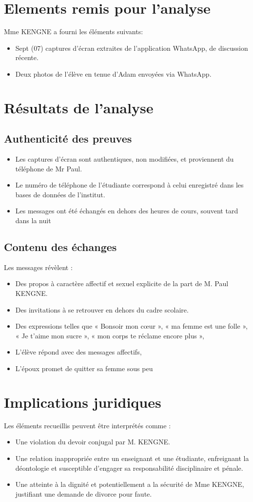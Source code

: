 \documentclass[12pt, a4paper]{article}
\begin{document}
\section{Elements remis pour l'analyse}
Mme KENGNE a fourni les éléments suivants:
\begin{itemize}
	\item Sept (07) captures d’écran extraites de l’application WhatsApp, de discussion
	      récente.
	\item Deux photos de l’élève en tenue d’Adam envoyées via WhatsApp.
\end{itemize}
\section{Résultats de l’analyse}
\subsection{Authenticité des preuves}
\begin{itemize}
	\item Les captures d’écran sont authentiques, non modifiées, et proviennent du
	      téléphone de Mr Paul.
	\item Le numéro de téléphone de l’étudiante correspond à celui enregistré dans les
	      bases de données de l’institut.
	\item Les messages ont été échangés en dehors des heures de cours, souvent tard dans
	      la nuit
\end{itemize}
\subsection{Contenu des échanges}
Les messages révèlent :
\begin{itemize}
	\item Des propos à caractère affectif et sexuel explicite de la part de M. Paul
	      KENGNE.
	\item Des invitations à se retrouver en dehors du cadre scolaire.
	\item Des expressions telles que « Bonsoir mon cœur », « ma femme est une folle », «
	      Je t’aime mon sucre », « mon corps te réclame encore plus »,
	\item L’élève répond avec des messages affectifs,
	\item L’époux promet de quitter sa femme sous peu
\end{itemize}
\section{Implications juridiques}
Les éléments recueillis peuvent être interprétés comme :
\begin{itemize}
	\item Une violation du devoir conjugal par M. KENGNE.
	\item Une relation inappropriée entre un enseignant et une étudiante, enfreignant la
	      déontologie et susceptible d’engager sa responsabilité disciplinaire et pénale.
	\item Une atteinte à la dignité et potentiellement a la sécurité de Mme KENGNE,
	      justifiant une demande de divorce pour faute.
\end{itemize}
\end{document}
